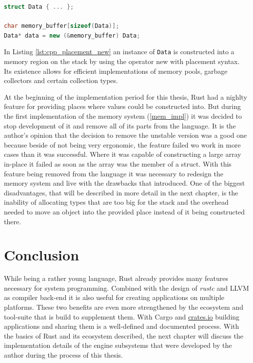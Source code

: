 \begin{lstlisting}[caption={Using placement-new to construct an object in a pre-allocated memory location}, label={lst:cpp_placement_new}, language=C++]
struct Data { ... };

char memory_buffer[sizeof(Data)];
Data* data = new (&memory_buffer) Data;
\end{lstlisting}

In Listing \ref{lst:cpp_placement_new} an instance of \texttt{Data} is constructed into a memory region on the stack by using the operator new with placement syntax. Its existence allows for efficient implementations of memory pools, garbage collectors and certain collection types.

At the beginning of the implementation period for this thesis, Rust had a nighlty feature for providing places where values could be constructed into. But during the first implementation of the memory system (\ref{mem_impl}) it was decided to stop development of it and remove all of its parts from the language. It is the author's opinion that the decision to remove the unstable version was a good one because beside of not being very ergonomic, the feature failed wo work in more cases than it was successful. Where it was capable of constructing a large array in-place it failed as soon as the array was the member of a struct. With this feature being removed from the language it was necessary to redesign the memory system and live with the drawbacks that introduced. One of the biggest disadvantages, that will be described in more detail in the next chapter, is the inability of allocating types that are too big for the stack and the overhead needed to move an object into the provided place instead of it being constructed there.

\section{Conclusion}

While being a rather young language, Rust already provides many features necessary for system programming. Combined with the design of \textit{rustc} and \ac{LLVM} as compiler back-end it is also useful for creating applications on multiple platforms. These two benefits are even more strengthened by the ecosystem and tool-suite that is build to supplement them. With Cargo and \url{crates.io} building applications and sharing them is a well-defined and documented process. With the basics of Rust and its ecosystem described, the next chapter will discuss the implementation details of the engine subsystems that were developed by the author during the process of this thesis.

